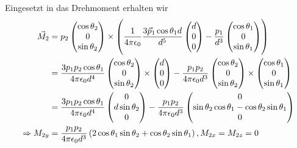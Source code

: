 \documentclass[a4paper,german,12pt,smallheadings]{scrartcl}
\begin{document}
\begin{enumerate}[a)]
    Eingesetzt in das Drehmoment erhalten wir
    \begin{align}
      \vec{M}_2 &= p_2 \begin{pmatrix}
        \cos \theta_2 \\
        0 \\
        \sin \theta_2
      \end{pmatrix}
      \times
      \del{
        \frac{1}{4 \pi \epsilon_0}
        \frac{3 \vec{p}_1 \cos \theta_1 d}{d^5} \begin{pmatrix} d \\ 0 \\ 0 \end{pmatrix} -
        \frac{p_1}{d^3} \begin{pmatrix} \cos \theta_1 \\ 0 \\ \sin \theta_1 \end{pmatrix}
      } \\
      &= \frac{3 p_1 p_2 \cos \theta_1}{4 \pi \epsilon_0 d^4}
        \begin{pmatrix} \cos \theta_2 \\ 0 \\ \sin \theta_2 \end{pmatrix} \times
        \begin{pmatrix} d \\ 0 \\ 0 \end{pmatrix}
        -
        \frac{p_1 p_2}{4 \pi \epsilon_0 d^3}
        \begin{pmatrix} \cos \theta_2 \\ 0 \\ \sin \theta_2 \end{pmatrix} \times
        \begin{pmatrix} \cos \theta_1 \\ 0 \\ \sin \theta_1 \end{pmatrix} \\
      &= \frac{3 p_1 p_2 \cos \theta_1}{4 \pi \epsilon_0 d^4}
         \begin{pmatrix} 0 \\ d \sin \theta_2 \\ 0 \end{pmatrix}
         - \frac{p_1 p_2}{4 \pi \epsilon_0 d^3}
           \begin{pmatrix}
             0 \\
             \sin \theta_2 \cos \theta_1 - \cos \theta_2 \sin \theta_1 \\
             0
           \end{pmatrix} \\
      \Rightarrow M_{2y} &= \frac{p_1p_2}{4 \pi \epsilon_0 d^3} \del{
        2 \cos \theta_1 \sin \theta_2 + \cos \theta_2 \sin \theta_1
      }, M_{2x} = M_{2z} = 0
    \end{align}


\end{enumerate}
\end{document}
